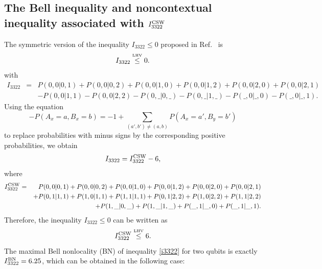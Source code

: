 \documentclass[pra,aps,notitlepage,superscriptaddress,showpacs,showkeys]{revtex4-1}
\theoremstyle{definition}
\theoremstyle{remark}
\begin{document}
\subsection{The Bell inequality and noncontextual inequality associated with $I_{3322}^{\rm CSW}$}
The symmetric version of the inequality $I_{3322}\le 0$ proposed in Ref.~\cite{BG08} is
\begin{equation}
 I_{3322} \stackrel{\mbox{\tiny{LHV}}}{\leq} 0.
\end{equation}
with
\begin{eqnarray}
 I_{3322} &=&P(0,0 \vert 0,1) + P(0,0 \vert 0,2) + P(0,0 \vert 1,0)+ P(0,0 \vert 1,2) + P(0,0 \vert 2,0) + P(0,0 \vert 2,1) \nonumber \\
                    &&- P(0,0 \vert 1,1) - P(0,0 \vert 2,2) - P(0,\_ \vert 0,\_) - P(0,\_ \vert 1,\_) - P(\_,0 \vert \_,0) - P(\_,0 \vert \_,1).
                    \label{I3322BG}
\end{eqnarray}
Using the equation
\begin{equation}
-P(A_x=a,B_x=b)=-1+\sum_{(a',b') \neq (a,b)} P(A_x=a',B_y=b')
\label{transformations}
\end{equation}
to replace probabilities with minus signs by the corresponding positive probabilities, we obtain
\begin{equation}
 I_{3322} = I_{3322}^{\rm CSW} - 6,
\end{equation}
where
\begin{eqnarray}
 I_{3322}^{\rm CSW}
 &=&P(0,0 \vert 0,1) + P(0,0 \vert 0,2) + P(0,0 \vert 1,0)+ P(0,0 \vert 1,2) + P(0,0 \vert 2,0) + P(0,0 \vert 2,1) \nonumber \\
 &&+ P(0,1 \vert 1,1) + P(1,0 \vert 1,1) + P(1,1 \vert 1,1)+ P(0,1 \vert 2,2) + P(1,0 \vert 2,2) + P(1,1 \vert 2,2) \nonumber \\
 &&+ P(1,\_ \vert 0,\_) +P(1,\_ \vert 1,\_) + P(\_,1 \vert \_,0) + P(\_,1 \vert \_,1).
\label{I3322CSW}
\end{eqnarray}
Therefore, the inequality $I_{3322}\le 0$ can be written as
\begin{equation}
 I_{3322}^{\rm CSW} \stackrel{\mbox{\tiny{LHV}}}{\leq} 6.\label{i3322}
\end{equation}
The maximal Bell nonlocality (BN) of inequality \eqref{i3322} for two qubits is exactly $ I_{3322}^{\rm BN}=6.25$, which can be  obtained in the following case:
\end{document}
